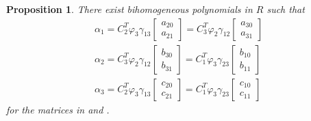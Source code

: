 \documentclass[reqno]{amsart}
\newtheorem{prop}[thm]{Proposition}
\numberwithin{equation}{section}
\theoremstyle{definition}
\begin{document}
\begin{prop}\label{dim 4 - alpha decomp}
    There exist bihomogeneous polynomials in $R$ such that
    \begin{equation}
        \begin{array}{c}
             \alpha_1=C_2^T \varphi_3\gamma_{13}\begin{bmatrix}
                 a_{20}\\
                 a_{21}
             \end{bmatrix}=C_3^T \varphi_2\gamma_{12}\begin{bmatrix}
                 a_{30}\\
                 a_{31}
             \end{bmatrix}\\[4ex]
             \alpha_2
             = C_3^T \varphi_2\gamma_{12}\begin{bmatrix}
                 b_{30}\\
                 b_{31}
             \end{bmatrix}=C_1^T \varphi_3\gamma_{23}\begin{bmatrix}
                 b_{10}\\
                 b_{11}
             \end{bmatrix}\\[4ex]
             \alpha_3 
             =C_2^T \varphi_3\gamma_{13}\begin{bmatrix}
                 c_{20}\\
                 c_{21}
             \end{bmatrix} 
             = C_1^T \varphi_3\gamma_{23}\begin{bmatrix}
                 c_{10}\\
                 c_{11}
             \end{bmatrix}
        \end{array}
    \end{equation}
for the matrices in  and .    
\end{prop}
\end{document}
